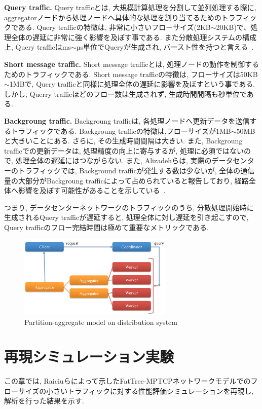 \documentclass[10pt, a4paper, twocolumn]{jsarticle}
\begin{document}
{\bf Query traffic. }Query trafficとは, 大規模計算処理を分割して並列処理する際に,
aggregatorノードから処理ノードへ具体的な処理を割り当てるためのトラフィックである.
Query trafficの特徴は, 非常に小さいフローサイズ(2KB$\sim$20KB)で、処理全体の遅延に非常に強く影響を及ぼす事である.
また分散処理システムの構成上, Query trafficはms$\sim$µs単位でQueryが生成され,
バースト性を持つと言える~\cite{dctcp}.

{\bf Short message traffic. } Short message trafficとは,
処理ノードの動作を制御するためのトラフィックである.
Short message trafficの特徴は, フローサイズは50KB$\sim$1MBで, Query
trafficと同様に処理全体の遅延に影響を及ぼすという事である.
しかし, Querry trafficほどのフロー数は生成されず, 生成時間間隔も秒単位である.

{\bf Backgroung traffic. }Backgroung trafficは,
各処理ノードへ更新データを送信するトラフィックである.
Backgroung trafficの特徴は,フローサイズが1MB$\sim$50MBと大きいことにある.
さらに, その生成時間間隔は大きい.
また, Backgroung trafficでの更新データは, 処理精度の向上に寄与するが, 処理に必須ではないので,
処理全体の遅延にはつながらない.
また, Alizadehらは, 実際のデータセンターのトラフィックでは, Background trafficが発生する数は少ないが,
全体の通信量の大部分がBackgroung trafficによって占められていると報告しており,
経路全体へ影響を及ぼす可能性があることを示している~\cite{traffic}.

つまり, データセンターネットワークのトラフィックのうち, 分散処理開始時に生成されるQuery trafficが遅延すると,
処理全体に対し遅延を引き起こすので, Query trafficのフロー完結時間は極めて重要なメトリックである.

\begin{figure}[h]
    \begin{center}
    \includegraphics[autoebb, width=210pt]{./img/part_aggr.pdf}
    \caption{Partition-aggregate model on distribution system}
    \label{fig:part_aggr}
    \end{center}
\end{figure}

\section{再現シミュレーション実験}
\label{sec:reproduction}
この章では,
Raiciuらによって示したFatTree-MPTCPネットワークモデルでのフローサイズの小さいトラフィックに対する性能評価シミュレーションを再現し,
解析を行った結果を示す.
\end{document}

